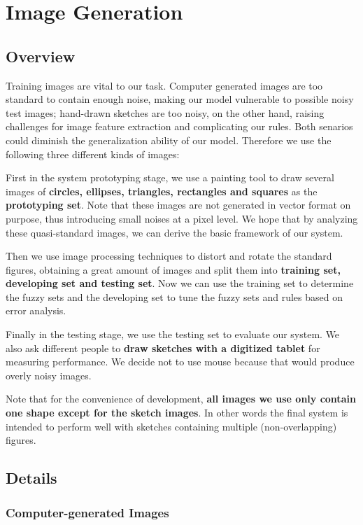 \section{Image Generation}

\subsection{Overview}

Training images are vital to our task. Computer generated images are too standard to contain enough noise, making our model vulnerable to possible noisy test images; hand-drawn sketches are too noisy, on the other hand, raising challenges for image feature extraction and complicating our rules. Both senarios could diminish the generalization ability of our model. Therefore we use the following three different kinds of images:

First in the system prototyping stage, we use a painting tool to draw several images of \textbf{circles, ellipses, triangles, rectangles and squares} as the \textbf{prototyping set}. Note that these images are not generated in vector format on purpose, thus introducing small noises at a pixel level. We hope that by analyzing these quasi-standard images, we can derive the basic framework of our system.

Then we use image processing techniques to distort and rotate the standard figures, obtaining a great amount of images and split them into \textbf{training set, developing set and testing set}. Now we can use the training set to determine the fuzzy sets and the developing set to tune the fuzzy sets and rules based on error analysis.

Finally in the testing stage, we use the testing set to evaluate our system. We also ask different people to \textbf{draw sketches with a digitized tablet} for measuring performance. We decide not to use mouse because that would produce overly noisy images.

Note that for the convenience of development, \textbf{all images we use only contain one shape except for the sketch images}. In other words the final system is intended to perform well with sketches containing multiple (non-overlapping) figures.

\subsection{Details}

\subsubsection{Computer-generated Images}

